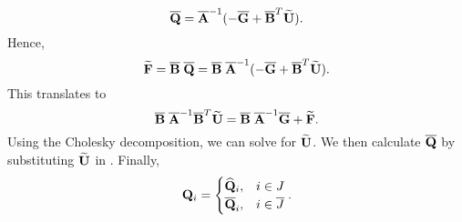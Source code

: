 \begin{discussion}
\begin{equation}
    \overline{\bf Q}
    = \overline{\bf A}^{-1}
      (- \overline{\bf G} + \overline{\bf B}^T \widetilde{\bf U}).
  \end{equation}
  Hence,
  \begin{equation}
    \widetilde{\bf F}
    = \overline{\bf B}\; \overline{\bf Q}
    = \overline{\bf B}\; \overline{\bf A}^{-1}
        (- \overline{\bf G} + \overline{\bf B}^T \widetilde{\bf U}).
  \end{equation}
  This translates to
  \begin{equation}
    \overline{\bf B}\; \overline{\bf A}^{-1} \overline{\bf B}^T 
      \widetilde{\bf U}
    = \overline{\bf B}\;
      \overline{\bf A}^{-1} \overline{\bf G} + \widetilde{\bf F}.
  \end{equation}
  Using the Cholesky decomposition, we can solve for $\widetilde{\bf U}$.
  We then calculate $\overline{\bf Q}$ by substituting $\widetilde{\bf U}$ in
  .
  Finally,
  \begin{equation}
    {\bf Q}_i =
    \begin{cases}
      \widehat{\bf Q}_i, & i \in J \\
      \overline{\bf Q}_i, & i \in \overline{J}
    \end{cases}.
  \end{equation}
\end{discussion}
